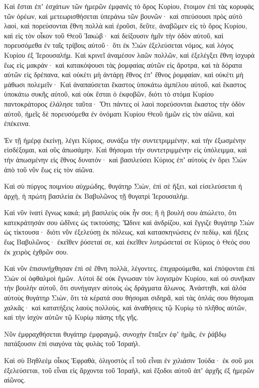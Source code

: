 \begin{spacing}{1.1}
\begin{multicols}{2}
Καὶ ἔσται ἐπʼ ἐσχάτων τῶν ἡμερῶν ἐμφανὲς τὸ ὄρος Κυρίου, ἕτοιμον ἐπὶ τὰς κορυφὰς τῶν ὀρέων, καὶ μετεωρισθήσεται ὑπεράνω τῶν βουνῶν· καὶ σπεύσουσι πρὸς αὐτὸ λαοὶ,
καὶ πορεύσονται ἔθνη πολλὰ καὶ ἐροῦσι, δεῦτε, ἀναβῶμεν εἰς τὸ ὄρος Κυρίου, καὶ εἰς τὸν οἶκον τοῦ Θεοῦ Ἰακώβ· καὶ δείξουσιν ἡμῖν τὴν ὁδὸν αὐτοῦ, καὶ πορευσόμεθα ἐν ταῖς τρίβοις αὐτοῦ· ὅτι ἐκ Σιὼν ἐξελεύσεται νόμος, καὶ λόγος Κυρίου ἐξ Ἱερουσαλήμ.
Καὶ κρινεῖ ἀναμέσον λαῶν πολλῶν, καὶ ἐξελέγξει ἔθνη ἰσχυρὰ ἕως εἰς μακράν· καὶ κατακόψουσι τὰς ῥομφαίας αὐτῶν εἰς ἄροτρα, καὶ τὰ δόρατα αὐτῶν εἰς δρέπανα, καὶ οὐκέτι μὴ ἀντάρῃ ἔθνος ἐπʼ ἔθνος ῥομφαίαν, καὶ οὐκέτι μὴ μάθωσι πολεμεῖν·
Καὶ ἀναπαύσεται ἕκαστος ὑποκάτω ἀμπέλου αὐτοῦ, καὶ ἕκαστος ὑποκάτω συκῆς αὐτοῦ, καὶ οὐκ ἔσται ὁ ἐκφοβῶν, διότι τὸ στόμα Κυρίου παντοκράτορος ἐλάλησε ταῦτα·
Ὅτι πάντες οἱ λαοὶ πορεύσονται ἕκαστος τὴν ὁδὸν αὐτοῦ, ἡμεῖς δὲ πορευσόμεθα ἐν ὀνόματι Κυρίου Θεοῦ ἡμῶν εἰς τὸν αἰῶνα, καὶ ἐπέκεινα.

Ἐν τῇ ἡμέρᾳ ἐκείνῃ, λέγει Κύριος, συνάξω τὴν συντετριμμένην, καὶ τὴν ἐξωσμένην εἰσδέξομαι, καὶ οὓς ἀπωσάμην.
Καὶ θήσομαι τὴν συντετριμμένην εἰς ὑπόλειμμα, καὶ τὴν ἀπωσμένην εἰς ἔθνος δυνατόν· καὶ βασιλεύσει Κύριος ἐπʼ αὐτοὺς ἐν ὄρει Σιὼν ἀπὸ τοῦ νῦν ἕως εἰς τὸν αἰῶνα.

Καὶ σὺ πύργος ποιμνίου αὐχμώδης, θυγάτηρ Σιὼν, ἐπὶ σὲ ἥξει, καὶ εἰσελεύσεται ἡ ἀρχὴ, ἡ πρώτη βασιλεία ἐκ Βαβυλῶνος τῇ θυγατρὶ Ἱερουσαλήμ.

Καὶ νῦν ἱνατί ἔγνως κακά; μὴ βασιλεὺς οὐκ ἦν σοι; ἢ ἡ βουλή σου ἀπώλετο, ὅτι κατεκράτησάν σου ὠδῖνες ὡς τικτούσης;
Ὤδινε καὶ ἀνδρίζου, καὶ ἔγγιζε θυγάτηρ Σιὼν ὡς τίκτουσα· διότι νῦν ἐξελεύσῃ ἐκ πόλεως, καὶ κατασκηνώσεις ἐν πεδίῳ, καὶ ἥξεις ἕως Βαβυλῶνος· ἐκεῖθεν ῥύσεταί σε, καὶ ἐκεῖθεν λυτρώσεταί σε Κύριος ὁ Θεός σου ἐκ χειρὸς ἐχθρῶν σου.

Καὶ νῦν ἐπισυνήχθησαν ἐπὶ σὲ ἔθνη πολλὰ, λέγοντες, ἐπιχαρούμεθα, καὶ ἐπόψονται ἐπὶ Σιὼν οἱ ὀφθαλμοὶ ἡμῶν.
Αὐτοὶ δὲ οὐκ ἔγνωσαν τὸν λογισμὸν Κυρίου, καὶ οὐ συνῆκαν τὴν βουλὴν αὐτοῦ, ὅτι συνήγαγεν αὐτοὺς ὡς δράγματα ἅλωνος.
Ἀνάστηθι, καὶ ἀλόα αὐτοὺς θυγάτηρ Σιὼν, ὅτι τὰ κέρατά σου θήσομαι σιδηρᾶ, καὶ τὰς ὁπλάς σου θήσομαι χαλκᾶς· καὶ κατατήξεις λαοὺς πολλοὺς, καὶ ἀναθήσεις τῷ Κυρίῳ τὸ πλῆθος αὐτῶν, καὶ τὴν ἰσχὺν αὐτῶν τῷ Κυρίῳ πάσης τῆς γῆς.

Νῦν ἐμφραχθήσεται θυγάτηρ ἐμφραγμῷ, συνοχὴν ἔταξεν ἐφʼ ἡμᾶς, ἐν ῥάβδῳ πατάξουσιν ἐπὶ σιαγόνα τὰς φυλὰς τοῦ Ἰσραήλ.

Καὶ σὺ Βηθλεὲμ οἶκος Ἐφραθὰ, ὀλιγοστὸς εἶ τοῦ εἶναι ἐν χιλιάσιν Ἰούδα· ἐκ σοῦ μοι ἐξελεύσεται, τοῦ εἶναι εἰς ἄρχοντα τοῦ Ἰσραὴλ, καὶ ἔξοδοι αὐτοῦ ἀπʼ ἀρχῆς ἐξ ἡμερῶν αἰῶνος.


\end{multicols}
\end{spacing}
